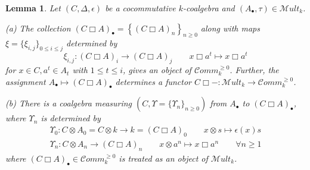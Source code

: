\documentclass[10pt, colorlinks]{article}
\numberwithin{equation}{section} \DeclareMathSizes{2}{10}{12}{13}
\newtheorem{lem}[thm]{Lemma}
\begin{document}
    
    \smallskip
    \begin{lem}\label{lem3.4}
        Let $(C,\Delta,\epsilon)$ be a cocommutative $k$-coalgebra and $(A_\bullet,\tau) \in \mathscr Mult_k$. 

        
        \medskip
        \noindent
        (a) The collection $(C\Box A)_\bullet=\left\{(C\Box A)_n\right\}_{n\geq 0}$ along with maps $\xi=\{\xi_{i,j}\}_{0\leq i\leq j}$ determined by  
          \begin{equation}\label{316dp}
              \xi_{i,j}:(C\Box A)_i\longrightarrow (C\Box A)_j\qquad x\Box a^t\longmapsto x\Box a^t
          \end{equation}
        for   $x\in C,a^t\in A_t$ with $1\leq t\leq i$, gives an object of $ \mathcal Comm^{\geq 0}_k$. Further, the assignment $A_\bullet\longmapsto (C\Box A)_\bullet$ determines a functor $C\Box-:\mathscr Mult_k\longrightarrow \mathcal Comm^{\geq 0}_k$.
        
        \medskip
        \noindent
        (b) There is a  coalgebra measuring $(C,\Upsilon=\{\Upsilon_n\}_{n\geq 0})$ from $A_\bullet$ to $(C\Box A)_\bullet$, where $\Upsilon_n$ is determined by 
        \begin{equation}
        \begin{array}{c}
        \Upsilon_0:C\otimes A_0=C\otimes k\longrightarrow k=(C\Box A)_0\qquad x\otimes s\mapsto \epsilon(x)s \\
          \Upsilon_n: C\otimes A_n\longrightarrow (C\Box A)_n\qquad x\otimes a^n\mapsto x\Box a^n \qquad\forall n\geq 1
          \end{array}
        \end{equation}   where $(C\Box A)_\bullet\in \mathcal Comm_k^{\geq 0}$ is treated as an object of $\mathscr Mult_k$.
    \end{lem}
\end{document}

